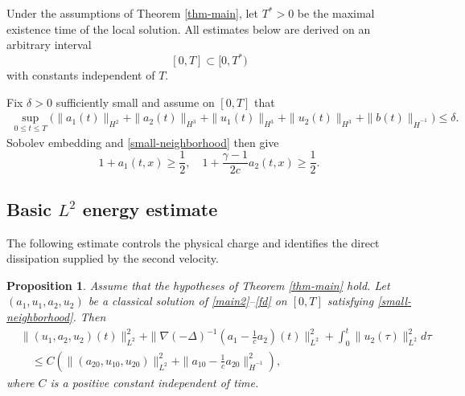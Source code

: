 \documentclass[10pt,reqno]{amsart}
\numberwithin{equation}{section}
\newtheorem{prop}[thm]{Proposition}
\begin{document}
Under the assumptions of Theorem \ref{thm-main}, let $T^*>0$ be the maximal existence time of the local solution. All estimates below are derived on an arbitrary interval
\[
[0,T]\subset[0,T^*)
\]
with constants independent of $T$.

Fix $\delta>0$ sufficiently small and assume on $[0,T]$ that
\begin{align}\label{small-neighborhood}
\sup_{0\le t\le T}\Big(
\|a_1(t)\|_{H^2}+\|a_2(t)\|_{H^3}
+\|u_1(t)\|_{H^3}+\|u_2(t)\|_{H^3}
+\|b(t)\|_{\dot H^{-1}}\Big)\le\delta.
\end{align}
Sobolev embedding and \eqref{small-neighborhood} then give
\[
1+a_1(t,x)\ge\frac12,
\quad
1+\frac{\gamma-1}{2c}a_2(t,x)\ge\frac12.
\]
 


%
%
%
%
%
%

\subsection{Basic $L^2$ energy estimate}
The following estimate controls the physical charge and identifies the direct dissipation supplied by the second velocity.
 \begin{prop}\label{p1}
Assume that the hypotheses of Theorem \ref{thm-main} hold. Let $(a_1,u_1,a_2,u_2)$ be a classical solution of \eqref{main2}--\eqref{fd} on $[0,T]$ satisfying  \eqref{small-neighborhood}. Then
 \begin{align*}
 	&\|(u_1,a_2,u_2)(t)\|_{L^2}^2+\|\nabla(-\Delta)^{-1}(a_1-\frac{1}{c}a_2)(t)\|_{L^2}^2
 	+\int_0^t\|u_2(\tau)\|_{L^2}^2d\tau\\
 	&\quad \leq C(\|(a_{20},u_{10},u_{20})\|_{L^2}^2+\|a_{10}-\frac{1}{c}a_{20}\|_{\dot{H}^{-1}}^2),
 \end{align*}	
 where $C$ is a positive constant independent of time.
\end{prop}	
\end{document}
